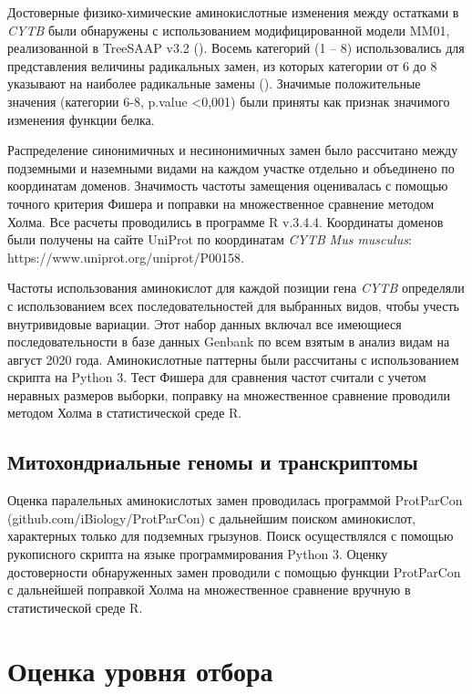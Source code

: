 Достоверные физико-химические аминокислотные изменения между остатками в \textit{CYTB} были обнаружены с использованием модифицированной модели MM01, реализованной в TreeSAAP v3.2 (\cite{Woolley2003}). Восемь категорий (1 -- 8) использовались для представления величины радикальных замен, из которых категории от 6 до 8 указывают на наиболее радикальные замены (\cite{McClellan2001}). Значимые положительные значения (категории 6-8, p.value <0,001) были приняты как признак значимого изменения функции белка.

Распределение синонимичных и несинонимичных замен было рассчитано между подземными и наземными видами на каждом участке отдельно и объединено по координатам доменов. Значимость частоты замещения оценивалась с помощью точного критерия Фишера и поправки на множественное сравнение методом Холма. Все расчеты проводились в программе R v.3.4.4. Координаты доменов были получены на сайте UniProt по координатам \textit{CYTB} \textit{Mus musculus}: https://www.uniprot.org/uniprot/P00158.

Частоты использования аминокислот для каждой позиции гена \textit{CYTB} определяли с использованием всех последовательностей для выбранных видов, чтобы учесть внутривидовые вариации. Этот набор данных включал все имеющиеся последовательности в базе данных Genbank по всем взятым в анализ видам на август 2020 года. Аминокислотные паттерны были рассчитаны с использованием скрипта на Python 3. Тест Фишера для сравнения частот считали с учетом неравных размеров выборки, поправку на множественное сравнение проводили методом Холма в статистической среде R.

\subsection{Митохондриальные геномы и транскриптомы}

Оценка паралельных аминокислотых замен проводилась программой ProtParCon (github.com/iBiology/ProtParCon) с дальнейшим поиском аминокислот, характерных только для подземных грызунов. Поиск осуществлялся с помощью рукописного скрипта на языке программирования Python 3. Оценку достоверности обнаруженных замен проводили с помощью функции ProtParCon с дальнейшей поправкой Холма на множественное сравнение вручную в статистической среде R.  

\section{Оценка уровня отбора}

